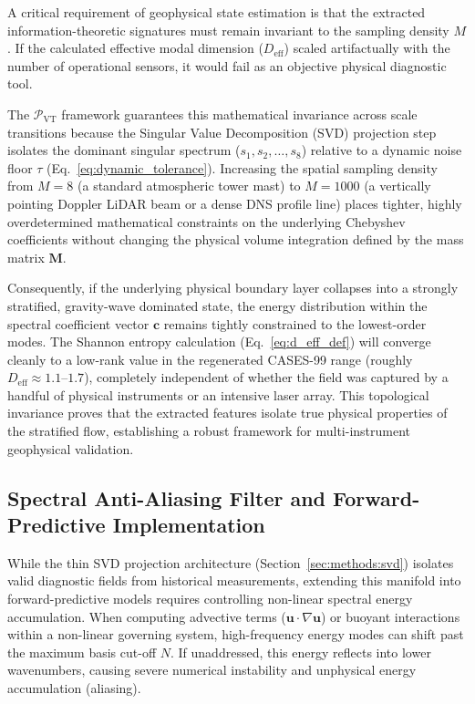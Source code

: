 \documentclass[11pt,a4paper]{article}
\begin{document}
A critical requirement of geophysical state estimation is that the extracted information-theoretic signatures must remain invariant to the sampling density $M$. If the calculated effective modal dimension ($D_{\mathrm{eff}}$) scaled artifactually with the number of operational sensors, it would fail as an objective physical diagnostic tool.

The $\mathcal{P}_{\mathrm{VT}}$ framework guarantees this mathematical invariance across scale transitions because the Singular Value Decomposition (SVD) projection step isolates the dominant singular spectrum ($s_1, s_2, \dots, s_8$) relative to a dynamic noise floor $\tau$ (Eq.~\ref{eq:dynamic_tolerance}). Increasing the spatial sampling density from $M = 8$ (a standard atmospheric tower mast) to $M = 1000$ (a vertically pointing Doppler LiDAR beam or a dense DNS profile line) places tighter, highly overdetermined mathematical constraints on the underlying Chebyshev coefficients without changing the physical volume integration defined by the mass matrix $\mathbf{M}$.

Consequently, if the underlying physical boundary layer collapses into a strongly stratified, gravity-wave dominated state, the energy distribution within the spectral coefficient vector $\mathbf{c}$ remains tightly constrained to the lowest-order modes. The Shannon entropy calculation (Eq.~\ref{eq:d_eff_def}) will converge cleanly to a low-rank value in the regenerated CASES-99 range (roughly $D_{\mathrm{eff}} \approx 1.1$--$1.7$), completely independent of whether the field was captured by a handful of physical instruments or an intensive laser array. This topological invariance proves that the extracted features isolate true physical properties of the stratified flow, establishing a robust framework for multi-instrument geophysical validation.

\subsection{Spectral Anti-Aliasing Filter and Forward-Predictive Implementation}
\label{sec:extensions:antialiasing}

While the thin SVD projection architecture (Section~\ref{sec:methods:svd}) isolates valid diagnostic fields from historical measurements, extending this manifold into forward-predictive models requires controlling non-linear spectral energy accumulation. When computing advective terms ($\mathbf{u} \cdot \nabla \mathbf{u}$) or buoyant interactions within a non-linear governing system, high-frequency energy modes can shift past the maximum basis cut-off $N$. If unaddressed, this energy reflects into lower wavenumbers, causing severe numerical instability and unphysical energy accumulation (aliasing).
\end{document}
